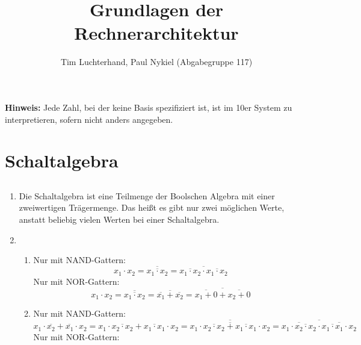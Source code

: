 \documentclass[DIN, pagenumber=false, fontsize=11pt, parskip=half]{scrartcl}
\title{Grundlagen der Rechnerarchitektur}
\author{Tim Luchterhand, Paul Nykiel (Abgabegruppe 117)}
\begin{document}
    \maketitle
    \textbf{Hinweis: } Jede Zahl, bei der keine Basis spezifiziert ist, ist im 10er System zu interpretieren, sofern nicht anders angegeben.
    \section{Schaltalgebra}
    \subsection{}
    \begin{enumerate}[label = (\alph*)]
        \item Die Schaltalgebra ist eine Teilmenge der Boolschen Algebra mit einer zweiwertigen Trägermenge. 
            Das heißt es gibt nur zwei möglichen Werte, anstatt beliebig vielen Werten bei einer Schaltalgebra.
        \item 
            \begin{enumerate}[label = (\roman*)]
                \item 
                    Nur mit NAND-Gattern:
                    \begin{equation*}
                        x_1 \cdot x_2 = \overline{\overline{x_1 \cdot x_2}} = \overline{\overline{x_1 \cdot x_2} \cdot \overline{x_1 \cdot x_2}}
                    \end{equation*}
                    Nur mit NOR-Gattern:
                    \begin{equation*}
                        x_1 \cdot x_2 = \overline{\overline{x_1 \cdot x_2}} = \overline{\overline{x_1} + \overline{x_2}}= \overline{\overline{x_1 + 0} + \overline{x_2 + 0}}
                    \end{equation*}
                \item
                    Nur mit NAND-Gattern:
                    \begin{equation*}
                        x_1 \cdot \overline{x_2} + \overline{x_1} \cdot x_2 = x_1 \cdot \overline{x_2 \cdot x_2} + \overline{x_1 \cdot x_1} \cdot x_2  
                        = \overline{\overline{x_1 \cdot \overline{x_2 \cdot x_2} + \overline{x_1 \cdot x_1} \cdot x_2}}
                        = \overline{\overline{x_1 \cdot \overline{x_2 \cdot x_2}} \cdot \overline{ \overline{x_1 \cdot x_1} \cdot x_2}}
                    \end{equation*}
                    Nur mit NOR-Gattern:
            \end{enumerate}
    \end{enumerate}
\end{document}
